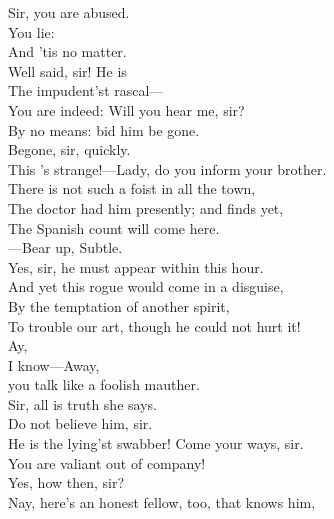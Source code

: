 \documentclass[a4paper,oneside]{memoir}
\begin{document}
\begin{drama*}
\surlyspeaks {} Sir, you are abused.\\
\kastrilspeaks {} You lie:\\
And 'tis no matter.\\
\facespeaks {} Well said, sir! He is\\
The impudent'st rascal---\\
\surlyspeaks {} You are indeed: Will you hear me, sir?\\
\facespeaks By no means: bid him be gone.\\
\kastrilspeaks {} Begone, sir, quickly.\\
\surlyspeaks This 's strange!---Lady, do you inform your brother.\\
\facespeaks There is not such a foist in all the town,\\
The doctor had him presently; and finds yet,\\
The Spanish count will come here.\\
 ---Bear up, Subtle.\\
\subtlespeaks Yes, sir, he must appear within this hour.\\
\facespeaks And yet this rogue would come in a disguise,\\
By the temptation of another spirit,\\
To trouble our art, though he could not hurt it!\\
\kastrilspeaks {} Ay,\\
I know---Away,\\
 you talk like a foolish mauther.\\
\surlyspeaks Sir, all is truth she says.\\
\facespeaks {} Do not believe him, sir.\\
He is the lying'st swabber! Come your ways, sir.\\
\surlyspeaks You are valiant out of company!\\
\kastrilspeaks {} Yes, how then, sir?\\
\facespeaks Nay, here's an honest fellow, too, that knows him,\\

\end{drama*}
\end{document}
